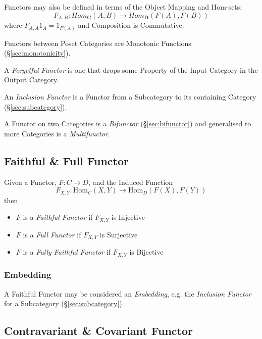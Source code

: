 Functors may also be defined in terms of the Object Mapping and Hom-sets:
\[
    F_{A,B} : Hom_{\mathbf{C}}(A,B) \rightarrow Hom_{\mathbf{D}}(F(A),F(B))
\]
where $F_{A,A}1_A = 1_{F(A)}$ and Composition is Commutative.

Functors between Poset Categories are Monotonic Functions
(\S\ref{sec:monotonicity}).

A \emph{Forgetful Functor} is one that drops some Property of the
Input Category in the Output Category.

An \emph{Inclusion Functor} is a Functor from a Subcategory to its
containing Category (\S\ref{sec:subcategory}).

A Functor on two Categories is a \emph{Bifunctor}
(\S\ref{sec:bifunctor}) and generalised to more Categories is a
\emph{Multifunctor}.



\subsection{Faithful \& Full Functor}\label{sec:faithful_functor}

Given a Functor, $F : C \rightarrow D$, and the Induced Function
\[
    F_{X,Y} : \mathrm{Hom}_C(X,Y) \rightarrow \mathrm{Hom}_D(F(X),F(Y))
\]
then
\begin{itemize}
    \item $F$ is a \emph{Faithful Functor} if $F_{X,Y}$ is Injective
    \item $F$ is a \emph{Full Functor} if $F_{X,Y}$ is Surjective
    \item $F$ is a \emph{Fully Faithful Functor} if $F_{X,Y}$ is
      Bijective
\end{itemize}



\subsubsection{Embedding}\label{sec:category_embedding}

A Faithful Functor may be considered an \emph{Embedding}, e.g. the
\emph{Inclusion Functor} for a Subcategory
(\S\ref{sec:subcategory}).



\subsection{Contravariant \& Covariant Functor}
\label{sec:contravariant_functor}

